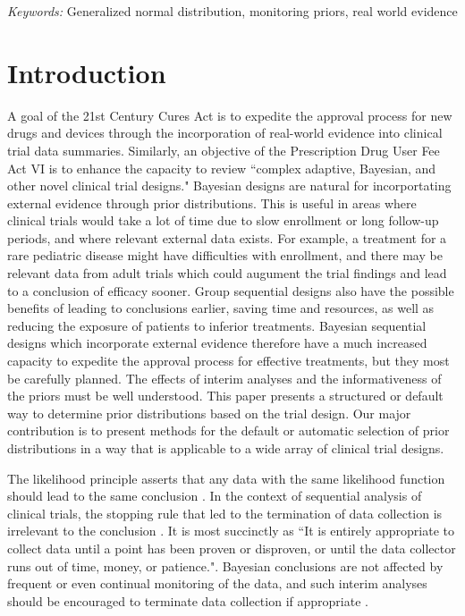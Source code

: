 \documentclass[12pt]{article}
\begin{document}
\noindent%
{\it Keywords:}  Generalized normal distribution, monitoring priors, real world evidence
\vfill

\newpage
{} %

\section{Introduction}

A goal of the 21st Century Cures Act \citep{USCongress2016} is to expedite the approval process for new drugs and devices through the incorporation of real-world evidence into clinical trial data summaries. Similarly, an objective of the Prescription Drug User Fee Act VI  is to enhance the capacity to review ``complex adaptive, Bayesian, and other novel clinical trial designs." \citep{FDA2017} Bayesian designs are natural for incorportating external evidence through prior distributions. This is useful in areas where clinical trials would take a lot of time due to slow enrollment or long follow-up periods, and where relevant external data exists. For example, a treatment for a rare pediatric disease might have difficulties with enrollment, and there may be relevant data from adult trials which could augument the trial findings and lead to a conclusion of efficacy sooner. Group sequential designs also have the possible benefits of leading to conclusions earlier, saving time and resources, as well as reducing the exposure of patients to inferior treatments. Bayesian sequential designs which incorporate external evidence therefore have a much increased capacity to expedite the approval process for effective treatments, but they most be carefully planned. The effects of interim analyses and the informativeness of the priors must be well understood. This paper presents a structured or default way to determine prior distributions based on the trial design. Our major contribution is to present methods for the default or automatic selection of prior distributions in a way that is applicable to a wide array of clinical trial designs.

The likelihood principle asserts that any data with the same likelihood function should lead to the same conclusion \citep{Berger1988}. In the context of sequential analysis of clinical trials, the stopping rule that led to the termination of data collection is irrelevant to the conclusion \citep{Barnard1947,Anscombe1963,Cornfield1966a,Cornfield1966b}. It is most succinctly as ``It is entirely appropriate to collect data until a point has been proven or disproven, or until the data collector runs out of time, money, or patience."\citep{Edwards1963}. Bayesian conclusions are not affected by frequent or even continual monitoring of the data, and such interim analyses should be encouraged to terminate data collection if appropriate \citep{Berry1989,Berry1993,Spiegelhalter1994}.
\end{document}
